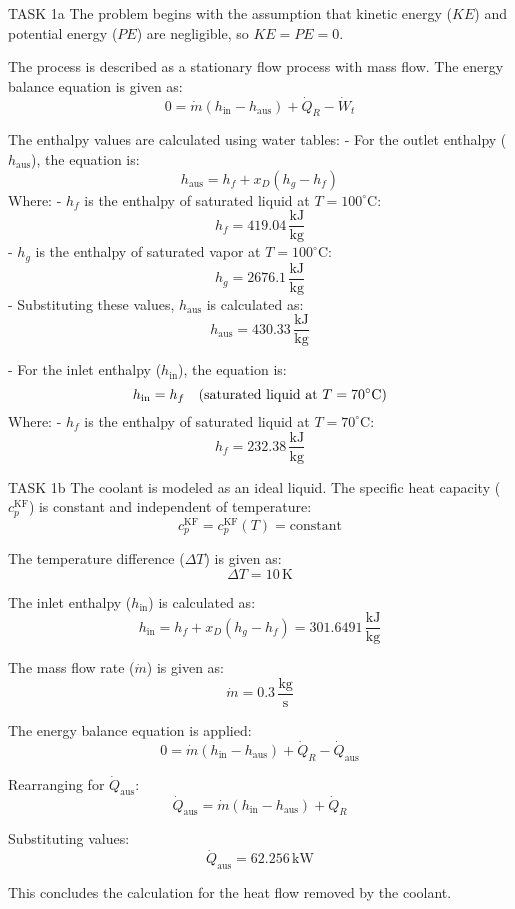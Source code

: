 TASK 1a  
The problem begins with the assumption that kinetic energy (\( KE \)) and potential energy (\( PE \)) are negligible, so \( KE = PE = 0 \).  

The process is described as a stationary flow process with mass flow. The energy balance equation is given as:  
\[
0 = \dot{m} \left( h_{\text{in}} - h_{\text{aus}} \right) + \dot{Q}_R - \dot{W}_t
\]  

The enthalpy values are calculated using water tables:  
- For the outlet enthalpy (\( h_{\text{aus}} \)), the equation is:  
\[
h_{\text{aus}} = h_f + x_D \left( h_g - h_f \right)
\]  
Where:  
  - \( h_f \) is the enthalpy of saturated liquid at \( T = 100^\circ\text{C} \):  
    \[
    h_f = 419.04 \, \frac{\text{kJ}}{\text{kg}}
    \]  
  - \( h_g \) is the enthalpy of saturated vapor at \( T = 100^\circ\text{C} \):  
    \[
    h_g = 2676.1 \, \frac{\text{kJ}}{\text{kg}}
    \]  
  - Substituting these values, \( h_{\text{aus}} \) is calculated as:  
    \[
    h_{\text{aus}} = 430.33 \, \frac{\text{kJ}}{\text{kg}}
    \]  

- For the inlet enthalpy (\( h_{\text{in}} \)), the equation is:  
\[
h_{\text{in}} = h_f \quad \text{(saturated liquid at \( T = 70^\circ\text{C} \))}  
\]  
Where:  
  - \( h_f \) is the enthalpy of saturated liquid at \( T = 70^\circ\text{C} \):  
    \[
    h_f = 232.38 \, \frac{\text{kJ}}{\text{kg}}
    \]  

TASK 1b  
The coolant is modeled as an ideal liquid. The specific heat capacity (\( c_p^{\text{KF}} \)) is constant and independent of temperature:  
\[
c_p^{\text{KF}} = c_p^{\text{KF}}(T) = \text{constant}
\]  

The temperature difference (\( \Delta T \)) is given as:  
\[
\Delta T = 10 \, \text{K}
\]  

The inlet enthalpy (\( h_{\text{in}} \)) is calculated as:  
\[
h_{\text{in}} = h_f + x_D \left( h_g - h_f \right) = 301.6491 \, \frac{\text{kJ}}{\text{kg}}
\]  

The mass flow rate (\( \dot{m} \)) is given as:  
\[
\dot{m} = 0.3 \, \frac{\text{kg}}{\text{s}}
\]  

The energy balance equation is applied:  
\[
0 = \dot{m} \left( h_{\text{in}} - h_{\text{aus}} \right) + \dot{Q}_R - \dot{Q}_{\text{aus}}
\]  

Rearranging for \( \dot{Q}_{\text{aus}} \):  
\[
\dot{Q}_{\text{aus}} = \dot{m} \left( h_{\text{in}} - h_{\text{aus}} \right) + \dot{Q}_R
\]  

Substituting values:  
\[
\dot{Q}_{\text{aus}} = 62.256 \, \text{kW}
\]  

This concludes the calculation for the heat flow removed by the coolant.